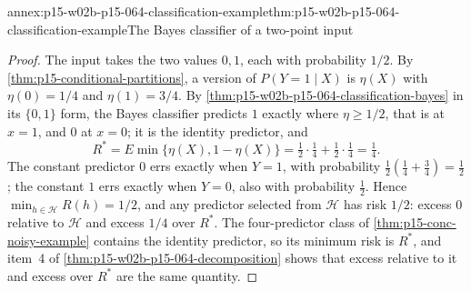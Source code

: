 \begin{annexitem}{annex:p15-w02b-p15-064-classification-example}{thm:p15-w02b-p15-064-classification-example}{The Bayes classifier of a two-point input}
\begin{proof}
The input takes the two values \(0,1\), each with probability \(1/2\). By
\cref{thm:p15-conditional-partitions}, a version of \(P(Y=1\mid X)\) is
\(\eta(X)\) with \(\eta(0)=1/4\) and \(\eta(1)=3/4\). By
\cref{thm:p15-w02b-p15-064-classification-bayes} in its \(\{0,1\}\) form,
the Bayes classifier predicts \(1\) exactly where \(\eta\geq1/2\), that is
at \(x=1\), and \(0\) at \(x=0\); it is the identity predictor, and
\[
 R^{*}=E\min\{\eta(X),1-\eta(X)\}=\tfrac12\cdot\tfrac14+\tfrac12\cdot\tfrac14=\tfrac14 .
\]
The constant predictor \(0\) errs exactly when \(Y=1\), with probability
\(\tfrac12(\tfrac14+\tfrac34)=\tfrac12\); the constant \(1\) errs exactly
when \(Y=0\), also with probability \(\tfrac12\). Hence
\(\min_{h\in\mathcal H}R(h)=1/2\), and any predictor selected from
\(\mathcal H\) has risk \(1/2\): excess \(0\) relative to \(\mathcal H\) and
excess \(1/4\) over \(R^{*}\). The four-predictor class of
\cref{thm:p15-conc-noisy-example} contains the identity predictor, so its
minimum risk is \(R^{*}\), and item~4 of
\cref{thm:p15-w02b-p15-064-decomposition} shows that excess relative to it
and excess over \(R^{*}\) are the same quantity.
\end{proof}
\end{annexitem}

